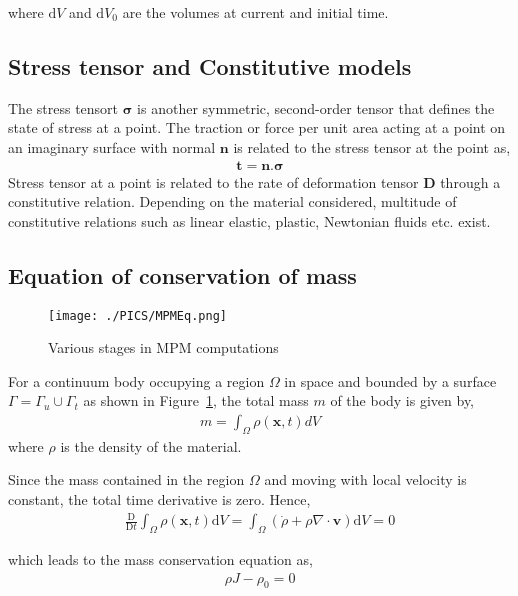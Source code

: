 where $\mathrm{d} V$ and $\mathrm{d} V_0$ are the volumes at current and initial time.

\subsection*{Stress tensor and Constitutive models}
The stress tensort $\mathbf{\sigma}$ is another symmetric, second-order tensor that defines the state of stress at a point. The traction or force per unit area acting at a point on an imaginary surface with normal $\mathbf{n}$ is related to the stress tensor at the point as,
\begin{align}
\mathbf{t} = \mathbf{n}.\mathbf{\sigma}
\end{align}
Stress tensor at a point is related to the rate of deformation tensor $\mathbf{D}$ through a constitutive relation. Depending on the material considered, multitude of constitutive relations such as linear elastic, plastic, Newtonian fluids etc. exist.


\subsection{Equation of conservation of mass}
\begin{figure}[h]
\texttt{[image: ./PICS/MPMEq.png]}
\caption{Various stages in MPM computations}
\label{Fig:MPM_Dom}
\end{figure}
For a continuum body occupying a region $\Omega$ in space and bounded by a surface $\Gamma=\Gamma_u \cup \Gamma_t$ as shown in Figure~\ref{Fig:MPM_Dom}, the total mass $m$ of the body is given by,
\begin{align}
m=\int_{\Omega} \rho(\mathbf{x}, t) d V
\end{align}
where $\rho$ is the density of the material.

Since the mass contained in the region $\Omega$ and moving with local velocity is constant, the total time derivative is zero. Hence,
\begin{align}
\frac{\mathrm{D}}{\mathrm{D} t} \int_{\Omega} \rho(\mathbf{x}, t) \mathrm{d} V=\int_{\Omega}(\dot{\rho}+\rho \nabla \cdot \boldsymbol{v}) \mathrm{d} V=0
\end{align}

which leads to the mass conservation equation as,
\begin{align}
\rho J-\rho_0=0
\end{align}

